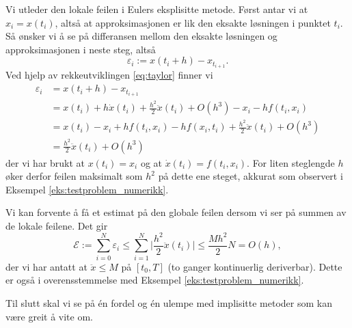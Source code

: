 \documentclass{article}
\theoremstyle{plain}
\theoremstyle{definition}
\theoremstyle{remark}
\newcommand{\fcn}{x}
\newcommand{\bigabs}[1]{\big|#1\big|}
\newcommand{\bigo}[1]{O(#1)}
\begin{document}
Vi utleder den lokale feilen i Eulers eksplisitte metode. Først antar vi at $\fcn_i = \fcn(t_i)$, altså at approksimasjonen er lik den eksakte løsningen i punktet $t_i$. Så ønsker vi å se på differansen mellom den eksakte løsningen og approksimasjonen i neste steg, altså
\begin{equation*}
    \varepsilon_i := \fcn(t_i + h) - \fcn_{t_{i+1}}.
\end{equation*}
Ved hjelp av rekkeutviklingen \eqref{eq:taylor} finner vi
\begin{equation*}
    \begin{aligned}
        \varepsilon_i & = \fcn(t_i + h) - \fcn_{t_{i+1}} \\
        & = \fcn(t_i) + h \dot{\fcn}(t_i) + \frac{h^2}{2} \ddot{\fcn}(t_i) + \bigo{h^3} - \fcn_i - h f(t_i, \fcn_i) \\
        & = \fcn(t_i) - \fcn_i + h f(t_i, \fcn_i) - h f(\fcn_i, t_i) + \frac{h^2}{2} \ddot{\fcn}(t_i) + \bigo{h^3} \\
        & = \frac{h^2}{2} \ddot{\fcn}(t_i) + \bigo{h^3}
    \end{aligned}
\end{equation*}
der vi har brukt at $\fcn(t_i) = \fcn_i$ og at $\dot{\fcn}(t_i) = f(t_i, \fcn_i)$. For liten steglengde $h$ øker derfor feilen maksimalt som $h^2$ på dette ene steget, akkurat som observert i Eksempel \ref{eks:testproblem_numerikk}.

Vi kan forvente å få et estimat på den globale feilen dersom vi ser på summen av de lokale feilene. Det gir
\begin{equation*}
    \mathcal{E} := \sum_{i = 0}^N \varepsilon_i \leq \sum_{i = 1}^N \bigabs{\frac{h^2}{2}\ddot{\fcn}(t_i)} \leq \frac{M h^2}{2} N = \bigo{h},
\end{equation*}
der vi har antatt at $\ddot{\fcn} \leq M$ på $[t_0, T]$ (to ganger kontinuerlig deriverbar). Dette er også i overensstemmelse med Eksempel \ref{eks:testproblem_numerikk}.

Til slutt skal vi se på én fordel og én ulempe med implisitte metoder som kan være greit å vite om.
\end{document}
